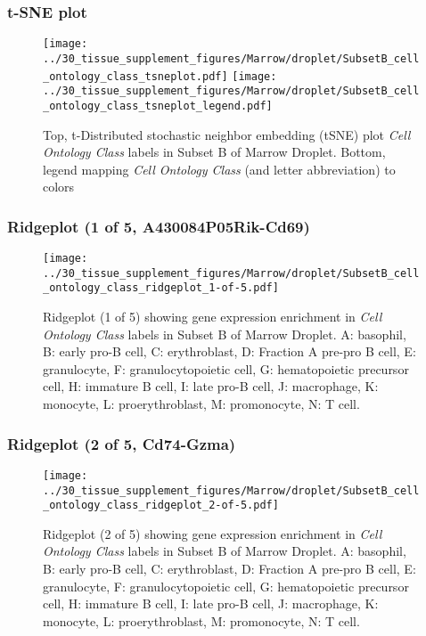 \clearpage
\subsubsection{t-SNE plot}
\begin{figure}[h]
\centering
\texttt{[image: ../30\_tissue\_supplement\_figures/Marrow/droplet/SubsetB\_cell\_ontology\_class\_tsneplot.pdf]}
\texttt{[image: ../30\_tissue\_supplement\_figures/Marrow/droplet/SubsetB\_cell\_ontology\_class\_tsneplot\_legend.pdf]}
\caption{Top, t-Distributed stochastic neighbor embedding (tSNE) plot  \emph{Cell Ontology Class} labels in Subset B of Marrow Droplet. Bottom, legend mapping \emph{Cell Ontology Class} (and letter abbreviation) to colors}
\end{figure}


\clearpage

\subsubsection{Ridgeplot (1 of 5, A430084P05Rik-Cd69)}
\begin{figure}[h]
\centering
\texttt{[image: ../30\_tissue\_supplement\_figures/Marrow/droplet/SubsetB\_cell\_ontology\_class\_ridgeplot\_1-of-5.pdf]}

\caption{ Ridgeplot (1 of 5)  showing gene expression enrichment in \emph{Cell Ontology Class} labels in Subset B of Marrow Droplet. A: basophil, B: early pro-B cell, C: erythroblast, D: Fraction A pre-pro B cell, E: granulocyte, F: granulocytopoietic cell, G: hematopoietic precursor cell, H: immature B cell, I: late pro-B cell, J: macrophage, K: monocyte, L: proerythroblast, M: promonocyte, N: T cell.}
\end{figure}


\clearpage

\subsubsection{Ridgeplot (2 of 5, Cd74-Gzma)}
\begin{figure}[h]
\centering
\texttt{[image: ../30\_tissue\_supplement\_figures/Marrow/droplet/SubsetB\_cell\_ontology\_class\_ridgeplot\_2-of-5.pdf]}

\caption{ Ridgeplot (2 of 5)  showing gene expression enrichment in \emph{Cell Ontology Class} labels in Subset B of Marrow Droplet. A: basophil, B: early pro-B cell, C: erythroblast, D: Fraction A pre-pro B cell, E: granulocyte, F: granulocytopoietic cell, G: hematopoietic precursor cell, H: immature B cell, I: late pro-B cell, J: macrophage, K: monocyte, L: proerythroblast, M: promonocyte, N: T cell.}
\end{figure}


